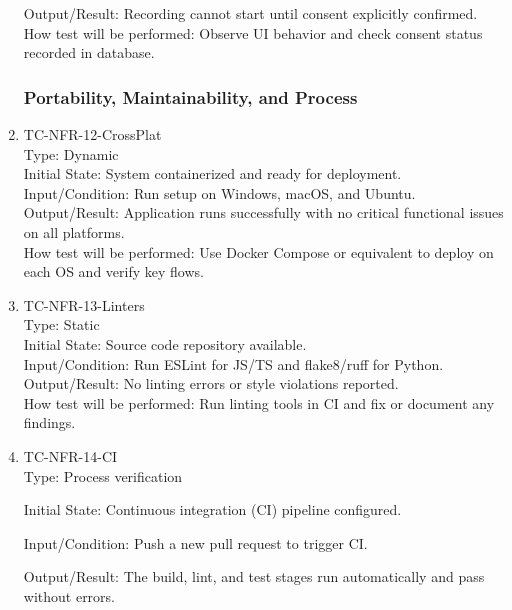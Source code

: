 \documentclass[12pt, titlepage]{article}
\begin{document}
\begin{enumerate}
Output/Result: Recording cannot start until consent explicitly confirmed.\\

How test will be performed: Observe UI behavior and check consent status recorded in database.

\subsubsection{Portability, Maintainability, and Process}

\item{TC-NFR-12-CrossPlat\\}
Type: Dynamic\\

Initial State: System containerized and ready for deployment.\\

Input/Condition: Run setup on Windows, macOS, and Ubuntu.\\

Output/Result: Application runs successfully with no critical functional issues on all platforms.\\

How test will be performed: Use Docker Compose or equivalent to deploy on each OS and verify key flows.

\item{TC-NFR-13-Linters\\}
Type: Static\\

Initial State: Source code repository available.\\

Input/Condition: Run ESLint for JS/TS and flake8/ruff for Python.\\

Output/Result: No linting errors or style violations reported.\\

How test will be performed: Run linting tools in CI and fix or document any findings.

\item{TC-NFR-14-CI\\}
Type: Process verification

Initial State: Continuous integration (CI) pipeline configured.

Input/Condition: Push a new pull request to trigger CI.

Output/Result: The build, lint, and test stages run automatically and pass without errors.


\end{enumerate}
\end{document}
